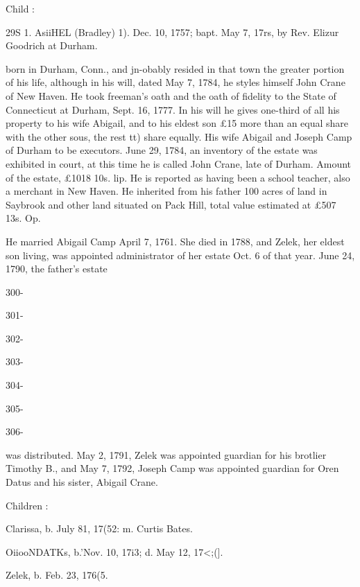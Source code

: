 \documentclass[oneside]{book}
\begin{document}
Child : 

29S 1. AsiiHEL (Bradley) 1). Dec. 10, 1757; bapt. May 7, 17rs, by 
Rev. Elizur Goodrich at Durham. 

born in Durham, Conn., and jn-obably resided in that town the 
greater portion of his life, although in his will, dated May 7, 
1784, he styles himself John Crane of New Haven. He took 
freeman's oath and the oath of fidelity to the State of Connecticut 
at Durham, Sept. 16, 1777. In his will he gives one-third of all 
his property to his wife Abigail, and to his eldest son £15 more 
than an equal share with the other sous, the rest tt) share equally. 
His wife Abigail and Joseph Camp of Durham to be executors. 
June 29, 1784, an inventory of the estate was exhibited in court, 
at this time he is called John Crane, late of Durham. Amount 
of the estate, £1018 10s.  lip. He is reported as having been 
a school teacher, also a merchant in New Haven. He inherited 
from his father 100 acres of land in Saybrook and other land 
situated on Pack Hill, total value estimated at £507  13s.  Op. 

He married Abigail Camp April 7, 1761. She died in 1788, and 
Zelek, her eldest son living, was appointed administrator of her 
estate Oct. 6 of that year. June 24, 1790, the father's estate 



300- 




301- 




302- 




303- 




304- 




305- 




306- 






was distributed. May 2, 1791, Zelek was appointed guardian 
for his brotlier Timothy B., and May 7, 1792, Joseph Camp was 
appointed guardian for Oren Datus and his sister, Abigail Crane. 

Children : 

Clarissa, b. July 81, 17(52: m. Curtis Bates. 

OiiooNDATKs, b.'Nov. 10, 17i3; d. May 12, 17<;(]. 

Zelek, b. Feb. 23, 176(5. 
\end{document}

